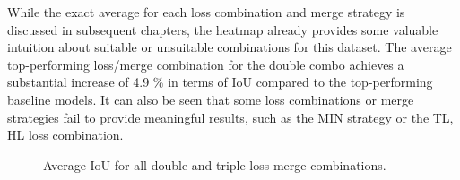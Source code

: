 While the exact average for each loss combination and merge strategy is discussed in subsequent chapters, the heatmap already provides some valuable intuition about suitable or unsuitable combinations for this dataset. The average top-performing loss/merge combination for the double combo achieves a substantial increase of 4.9 \% in terms of \ac{IoU} compared to the top-performing baseline models. It can also be seen that some loss combinations or merge strategies fail to provide meaningful results, such as the MIN strategy or the TL, HL loss combination. 
\begin{figure}[H]%
  \centering
  \caption[Overall performance of triple combinations]{Average \ac{IoU} for all double and triple loss-merge combinations.}
  \label{overall_double_triple_idrid}
\end{figure}

